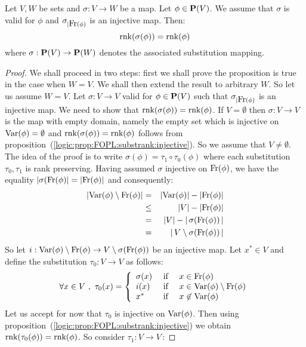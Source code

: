 \begin{prop}\label{logic:prop:FOPL:substrank:invariant:rank}
Let $V,W$ be sets and $\sigma:V\to W$ be a map. Let $\phi\in\mbox{${\bf P}(V)$}$. We
assume that $\sigma$ is valid for $\phi$ and $\sigma_{|\mbox{\rm Fr}(\phi)}$
is an injective map. Then:
    \[
    \mbox{\rm rnk}(\sigma(\phi))=\mbox{\rm rnk}(\phi)
    \]
where $\sigma:\mbox{${\bf P}(V)$}\to{\bf P}(W)$ denotes the associated substitution
mapping.
\end{prop}
\begin{proof}
We shall proceed in two steps: first we shall prove the proposition
is true in the case when $W=V$. We shall then extend the result to
arbitrary $W$. So let us assume $W=V$. Let $\sigma:V\to V$ valid for
$\phi\in\mbox{${\bf P}(V)$}$ such that $\sigma_{|\mbox{\rm Fr}(\phi)}$ is an injective map.
We need to show that $\mbox{\rm rnk}(\sigma(\phi))=\mbox{\rm rnk}(\phi)$. If
$V=\emptyset$ then $\sigma:V\to V$ is the map with empty domain,
namely the empty set which is injective on $\mbox{\rm Var}(\phi)=\emptyset$
and $\mbox{\rm rnk}(\sigma(\phi))=\mbox{\rm rnk}(\phi)$ follows from
proposition~(\ref{logic:prop:FOPL:substrank:injective}). So we
assume that $V\neq\emptyset$. The idea of the proof is to write
$\sigma(\phi)=\tau_{1}\circ\tau_{0}(\phi)$ where each substitution
$\tau_{0}, \tau_{1}$ is rank preserving. Having assumed $\sigma$
injective on $\mbox{\rm Fr}(\phi)$, we have the equality
$|\sigma(\mbox{\rm Fr}(\phi)|=|\mbox{\rm Fr}(\phi)|$ and consequently:
    \begin{eqnarray*}
    |\mbox{\rm Var}(\phi)\setminus\mbox{\rm Fr}(\phi)|&=&|\mbox{\rm Var}(\phi)|-|\mbox{\rm Fr}(\phi)|\\
    &\leq&|V|-|\mbox{\rm Fr}(\phi)|\\
    &=&|V|-|\,\sigma(\mbox{\rm Fr}(\phi))\,|\\
    &=&|\,V\setminus\sigma(\mbox{\rm Fr}(\phi))\,|
    \end{eqnarray*}
So let $i:\mbox{\rm Var}(\phi)\setminus\mbox{\rm Fr}(\phi)\to
V\setminus\sigma(\mbox{\rm Fr}(\phi))$ be an injective map. Let $x^{*}\in V$
and define the substitution $\tau_{0}:V\to V$ as follows:
    \[
    \forall x\in V\ ,\ \tau_{0}(x)=\left\{
        \begin{array}{lcl}
        \sigma(x)&\mbox{\ if\ }&x\in\free(\phi)\\
        i(x)&\mbox{\ if\ }&x\in\var(\phi)\setminus\free(\phi)\\
        x^{*}&\mbox{\ if\ }&x\not\in\var(\phi)
        \end{array}
    \right.
    \]
Let us accept for now that $\tau_{0}$ is injective on $\mbox{\rm Var}(\phi)$.
Then using proposition~(\ref{logic:prop:FOPL:substrank:injective})
we obtain $\mbox{\rm rnk}(\tau_{0}(\phi))=\mbox{\rm rnk}(\phi)$. So consider
$\tau_{1}:V\to V$\,:

\end{proof}

